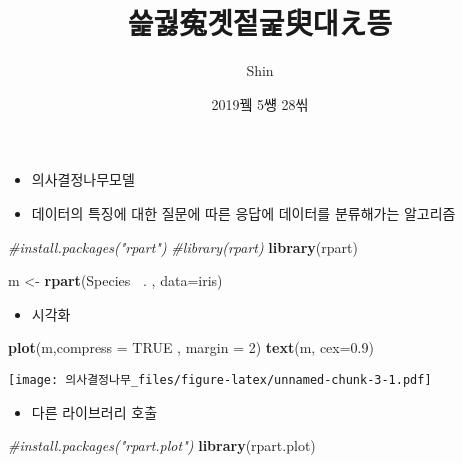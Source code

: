 \documentclass[]{article}
\title{쓽궗寃곗젙굹臾대え뜽}
\author{Shin}
\date{2019뀈 5썡 28씪}
\newenvironment{Shaded}{\begin{snugshade}}{\end{snugshade}}
\newcommand{\KeywordTok}[1]{\textcolor[rgb]{0.13,0.29,0.53}{\textbf{#1}}}
\newcommand{\DataTypeTok}[1]{\textcolor[rgb]{0.13,0.29,0.53}{#1}}
\newcommand{\DecValTok}[1]{\textcolor[rgb]{0.00,0.00,0.81}{#1}}
\newcommand{\FloatTok}[1]{\textcolor[rgb]{0.00,0.00,0.81}{#1}}
\newcommand{\StringTok}[1]{\textcolor[rgb]{0.31,0.60,0.02}{#1}}
\newcommand{\CommentTok}[1]{\textcolor[rgb]{0.56,0.35,0.01}{\textit{#1}}}
\newcommand{\OtherTok}[1]{\textcolor[rgb]{0.56,0.35,0.01}{#1}}
\newcommand{\OperatorTok}[1]{\textcolor[rgb]{0.81,0.36,0.00}{\textbf{#1}}}
\newcommand{\NormalTok}[1]{#1}
\providecommand{\tightlist}{%
  \setlength{\itemsep}{0pt}\setlength{\parskip}{0pt}}
\begin{document}
\maketitle

\begin{itemize}
\tightlist
\item
  의사결정나무모델
\item
  데이터의 특징에 대한 질문에 따른 응답에 데이터를 분류해가는 알고리즘
\end{itemize}

\begin{Shaded}
\begin{Highlighting}[]
\CommentTok{#install.packages("rpart")}
\CommentTok{#library(rpart)}
\KeywordTok{library}\NormalTok{(rpart)}
\end{Highlighting}
\end{Shaded}

\begin{Shaded}
\begin{Highlighting}[]
\NormalTok{m <-}\StringTok{ }\KeywordTok{rpart}\NormalTok{(Species }\OperatorTok{~}\NormalTok{. , }\DataTypeTok{data=}\NormalTok{iris)}
\end{Highlighting}
\end{Shaded}

\begin{itemize}
\tightlist
\item
  시각화
\end{itemize}

\begin{Shaded}
\begin{Highlighting}[]
\KeywordTok{plot}\NormalTok{(m,}\DataTypeTok{compress =} \OtherTok{TRUE}\NormalTok{ , }\DataTypeTok{margin =} \DecValTok{2}\NormalTok{)}
\KeywordTok{text}\NormalTok{(m, }\DataTypeTok{cex=}\FloatTok{0.9}\NormalTok{)}
\end{Highlighting}
\end{Shaded}

\texttt{[image: 의사결정나무\_files/figure-latex/unnamed-chunk-3-1.pdf]}

\begin{itemize}
\tightlist
\item
  다른 라이브러리 호출
\end{itemize}

\begin{Shaded}
\begin{Highlighting}[]
\CommentTok{#install.packages("rpart.plot")}
\KeywordTok{library}\NormalTok{(rpart.plot)}
\end{Highlighting}
\end{Shaded}
\end{document}
